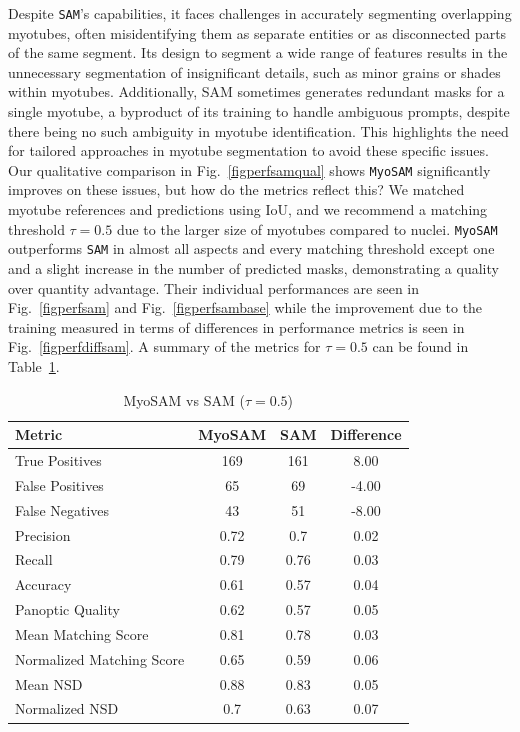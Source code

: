 Despite \texttt{SAM}'s capabilities, it faces challenges in accurately segmenting overlapping myotubes, often misidentifying them as separate entities or as disconnected parts of the same segment. Its design to segment a wide range of features results in the unnecessary segmentation of insignificant details, such as minor grains or shades within myotubes. Additionally, SAM sometimes generates redundant masks for a single myotube, a byproduct of its training to handle ambiguous prompts, despite there being no such ambiguity in myotube identification. This highlights the need for tailored approaches in myotube segmentation to avoid these specific issues. Our qualitative comparison in Fig.~\ref{figperfsamqual} shows \texttt{MyoSAM} significantly improves on these issues, but how do the metrics reflect this? We matched myotube references and predictions using IoU, and we recommend a matching threshold $\tau = 0.5$ due to the larger size of myotubes compared to nuclei. \texttt{MyoSAM} outperforms \texttt{SAM} in almost all aspects and every matching threshold except one and a slight increase in the number of predicted masks, demonstrating a quality over quantity advantage. Their individual performances are seen in Fig.~\ref{figperfsam} and Fig.~\ref{figperfsambase} while the improvement due to the training measured in terms of differences in performance metrics is seen in Fig.~\ref{figperfdiffsam}. A summary of the metrics for $\tau = 0.5$ can be found in Table~\ref{tabmyosamvssam}.
\begin{table}[H]
	\centering
	\caption{MyoSAM vs SAM ($\tau = 0.5$)}
	\label{tabmyosamvssam}
	\begin{tabular}{|l|c|c|c|}
		\hline
		Metric & MyoSAM & SAM & Difference \\
		\hline
		True Positives & 169 & 161 & 8.00 \\
		\hline
		False Positives & 65 & 69 & -4.00 \\
		\hline
		False Negatives & 43 & 51 & -8.00 \\
		\hline
		Precision & 0.72 & 0.7 & 0.02 \\
		\hline
		Recall & 0.79 & 0.76 & 0.03 \\
		\hline
		Accuracy & 0.61 & 0.57 & 0.04 \\
		\hline
		Panoptic Quality & 0.62 & 0.57 & 0.05 \\
		\hline
		Mean Matching Score & 0.81 & 0.78 & 0.03 \\
		\hline
		Normalized Matching Score & 0.65 & 0.59 & 0.06 \\
		\hline
		Mean NSD & 0.88 & 0.83 & 0.05 \\
		\hline
		Normalized NSD & 0.7 & 0.63 & 0.07 \\
		\hline
	\end{tabular}
\end{table}
